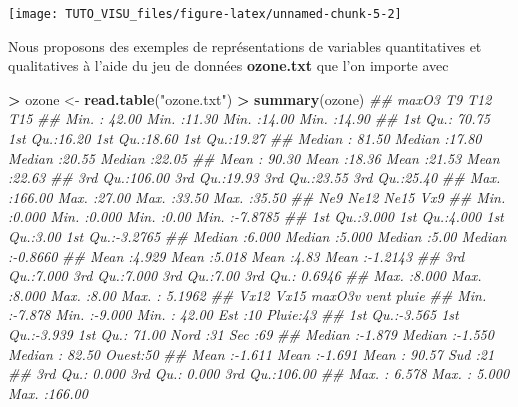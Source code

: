 \documentclass[]{article}
\newenvironment{Shaded}{\begin{snugshade}}{\end{snugshade}}
\newcommand{\CommentTok}[1]{\textcolor[rgb]{0.56,0.35,0.01}{\textit{#1}}}
\newcommand{\KeywordTok}[1]{\textcolor[rgb]{0.13,0.29,0.53}{\textbf{#1}}}
\newcommand{\NormalTok}[1]{#1}
\newcommand{\OperatorTok}[1]{\textcolor[rgb]{0.81,0.36,0.00}{\textbf{#1}}}
\newcommand{\StringTok}[1]{\textcolor[rgb]{0.31,0.60,0.02}{#1}}
\theoremstyle{definition}
\theoremstyle{definition}
\theoremstyle{definition}
\theoremstyle{remark}
\begin{document}
\begin{center}\texttt{[image: TUTO\_VISU\_files/figure-latex/unnamed-chunk-5-2]} \end{center}

Nous proposons des exemples de représentations de variables quantitatives et qualitatives à l'aide du jeu de données \textbf{ozone.txt} que l'on importe avec

\begin{Shaded}
\begin{Highlighting}[]
\OperatorTok{>}\StringTok{ }\NormalTok{ozone <-}\StringTok{ }\KeywordTok{read.table}\NormalTok{(}\StringTok{"ozone.txt"}\NormalTok{)}
\OperatorTok{>}\StringTok{ }\KeywordTok{summary}\NormalTok{(ozone)}
\CommentTok{##      maxO3              T9             T12             T15       }
\CommentTok{##  Min.   : 42.00   Min.   :11.30   Min.   :14.00   Min.   :14.90  }
\CommentTok{##  1st Qu.: 70.75   1st Qu.:16.20   1st Qu.:18.60   1st Qu.:19.27  }
\CommentTok{##  Median : 81.50   Median :17.80   Median :20.55   Median :22.05  }
\CommentTok{##  Mean   : 90.30   Mean   :18.36   Mean   :21.53   Mean   :22.63  }
\CommentTok{##  3rd Qu.:106.00   3rd Qu.:19.93   3rd Qu.:23.55   3rd Qu.:25.40  }
\CommentTok{##  Max.   :166.00   Max.   :27.00   Max.   :33.50   Max.   :35.50  }
\CommentTok{##       Ne9             Ne12            Ne15           Vx9         }
\CommentTok{##  Min.   :0.000   Min.   :0.000   Min.   :0.00   Min.   :-7.8785  }
\CommentTok{##  1st Qu.:3.000   1st Qu.:4.000   1st Qu.:3.00   1st Qu.:-3.2765  }
\CommentTok{##  Median :6.000   Median :5.000   Median :5.00   Median :-0.8660  }
\CommentTok{##  Mean   :4.929   Mean   :5.018   Mean   :4.83   Mean   :-1.2143  }
\CommentTok{##  3rd Qu.:7.000   3rd Qu.:7.000   3rd Qu.:7.00   3rd Qu.: 0.6946  }
\CommentTok{##  Max.   :8.000   Max.   :8.000   Max.   :8.00   Max.   : 5.1962  }
\CommentTok{##       Vx12             Vx15            maxO3v          vent      pluie   }
\CommentTok{##  Min.   :-7.878   Min.   :-9.000   Min.   : 42.00   Est  :10   Pluie:43  }
\CommentTok{##  1st Qu.:-3.565   1st Qu.:-3.939   1st Qu.: 71.00   Nord :31   Sec  :69  }
\CommentTok{##  Median :-1.879   Median :-1.550   Median : 82.50   Ouest:50             }
\CommentTok{##  Mean   :-1.611   Mean   :-1.691   Mean   : 90.57   Sud  :21             }
\CommentTok{##  3rd Qu.: 0.000   3rd Qu.: 0.000   3rd Qu.:106.00                        }
\CommentTok{##  Max.   : 6.578   Max.   : 5.000   Max.   :166.00}
\end{Highlighting}
\end{Shaded}
\end{document}
